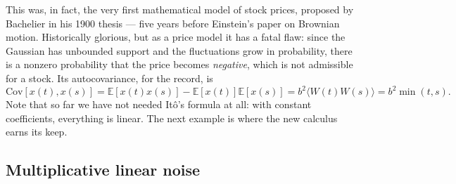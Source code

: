 This was, in fact, the very first mathematical model of stock prices, proposed by Bachelier in his 1900 thesis\cite{Bachelier1900} --- five years before Einstein's paper on Brownian motion.
Historically glorious, but as a price model it has a fatal flaw: since the Gaussian has unbounded support and the fluctuations grow in probability, there is a nonzero probability that the price becomes \emph{negative}, which is not admissible for a stock.
Its autocovariance, for the record, is
\begin{equation}
\mathrm{Cov}[x(t),x(s)] = \mathbb{E}[x(t)x(s)] - \mathbb{E}[x(t)]\mathbb{E}[x(s)] = b^2\langle W(t)W(s)\rangle = b^2\min(t,s).
\end{equation}
Note that so far we have not needed It\^o's formula at all: with constant coefficients, everything is linear.
The next example is where the new calculus earns its keep.

\subsection{Multiplicative linear noise}

